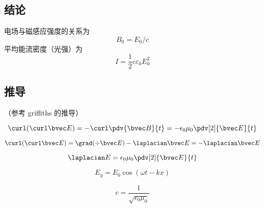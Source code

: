 
\subsection{结论}
电场与磁感应强度的关系为
\begin{equation}
B_0 = E_0/c
\end{equation}
平均能流密度（光强）为
\begin{equation}
I = \frac12 c\varepsilon_0 E_0^2
\end{equation}


\subsection{推导}
（参考 griffiths 的推导）

\begin{equation}
\curl(\curl \bvec E) = -\curl\pdv{\bvec B}{t} = -\epsilon_0\mu_0 \pdv[2]{\bvec E}{t}
\end{equation}

\begin{equation}
\curl(\curl \bvec E) = \grad(\div \bvec E) - \laplacian \bvec E = - \laplacian \bvec E
\end{equation}

\begin{equation}
\laplacian E = \epsilon_0 \mu_0 \pdv[2]{\bvec E}{t}
\end{equation}

\begin{equation}
E_y = E_0\cos(\omega t - kx)
\end{equation}

\begin{equation}
c = \frac{1}{\sqrt{\epsilon_0\mu_0}}
\end{equation}
